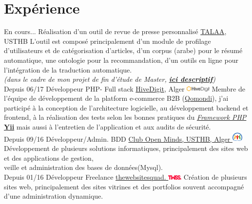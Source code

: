 \documentclass[]{friggeri-cv}
\begin{document}
\section{Expérience}
\begin{entrylist}
  \entry
    {En cours...}
    {Réalisation d'un outil de revue de presse personnalisé}
    {\href{http://lria.usthb.dz/TALAATeam/People.php}{TALAA}, USTHB }
    {L'outil est composé principalement d'un module de profilage d'utilisateurs et de catégorisation d'articles, d'un corpus (arabe) pour le résumé automatique, une ontologie pour la recommandation, d'un outils en ligne pour l’intégration de la traduction automatique.\\\emph{(dans le cadre de mon projet de fin d'étude de Master, \href{http://www.abafann.com/said_pfe.pdf}{\textbf{ici descriptif}})}\\}
  \entry
    {Depuis 06/17}
    {Développeur PHP- Full stack}
    {\href{http://www.hivedigit.com/}{HiveDigit}, Alger \includegraphics[width=35pt]{images/hivedigit.png} }
    {Membre de l'équipe de développement de la platform e-commerce B2B (\href{http://www.demo.b2b-dz.com/}{Qomondi}), j'ai participé à la conception de l'architecture logicielle, au développement backend et frontend, à la réalisation des tests selon les bonnes pratiques du \href{https://fr.wikipedia.org/wiki/Liste_de_frameworks_PHP}{\emph{Framework PHP}} \href{http://www.yiiframework.com/}{\textbf{Yii}} mais aussi à l'entretien de l'application et aux audits de sécurité.\\}
  \entry
    {Depuis 09/16}
    {Développeur/Admin. BDD}
    {\href{http://www.openmindsclub.net/}{Club Open Minds, USTHB, Alger \includegraphics[width=15pt]{images/favicon.png}}}
    {Développement de plusieurs solutions informatiques, principalement des sites web et des applications de gestion,\\veille et administration des bases de données(Mysql).\\}
  \entry
    {Depuis 01/16}
    {Développeur Freelance}
    {\href{http://www.twss.digital/}{thewebsitesquad. \includegraphics[width=20pt]{images/twss.png}}}
    {Création de plusieurs sites web, principalement des sites vitrines et des portfolios souvent accompagné d'une administration dynamique.\\
}
\end{entrylist}
\end{document}
